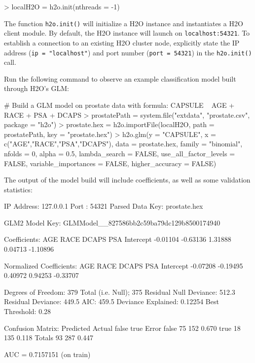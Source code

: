 \documentclass[11pt]{article}
\begin{document}
\begin{spverbatim}
> localH2O = h2o.init(nthreads = -1)

\end{spverbatim}
\noindent
The function \texttt{h2o.init()} will initialize a H2O instance and instantiates a H2O client module. By default, the H2O instance will launch on \texttt{localhost:54321}. To establish a connection to an existing H2O cluster node, explicitly state the IP address (\texttt{ip = "localhost"}) and port number (\texttt{port = 54321}) in the \texttt{h2o.init()} call.

\noindent
Run the following command to observe an example classification model built through H2O's GLM:

\begin{spverbatim}
# Build a GLM model on prostate data with formula: CAPSULE ~ AGE + RACE + PSA + DCAPS
> prostatePath = system.file("extdata", "prostate.csv", package = "h2o")
> prostate.hex = h2o.importFile(localH2O, path = prostatePath, key = "prostate.hex")
> h2o.glm(y = "CAPSULE", x = c("AGE","RACE","PSA","DCAPS"), data = prostate.hex, family = "binomial", nfolds = 0, alpha = 0.5, lambda_search = FALSE,  
use_all_factor_levels = FALSE, variable_importances = FALSE, higher_accuracy = FALSE)
\end{spverbatim}

\vspace{10 mm}
\noindent
The output of the model build will include coefficients, as well as some validation statistics:

\begin{spverbatim}       
IP Address: 127.0.0.1 
Port      : 54321 
Parsed Data Key: prostate.hex 

GLM2 Model Key: GLMModel__827586bb2c59ba79dc129b8500174940

Coefficients:
      AGE      RACE     DCAPS       PSA Intercept 
 -0.01104  -0.63136   1.31888   0.04713  -1.10896 

Normalized Coefficients:
      AGE      RACE     DCAPS       PSA Intercept 
 -0.07208  -0.19495   0.40972   0.94253  -0.33707 

Degrees of Freedom: 379 Total (i.e. Null);  375 Residual
Null Deviance:     512.3
Residual Deviance: 449.5  AIC: 459.5
Deviance Explained: 0.12254 
 Best Threshold: 0.28

Confusion Matrix:
        Predicted
Actual   false true Error
  false     75  152 0.670
  true      18  135 0.118
  Totals    93  287 0.447

AUC =  0.7157151 (on train)
\end{spverbatim}
\end{document}
